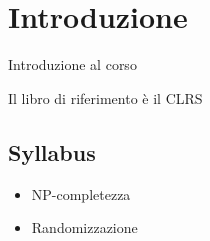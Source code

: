 
\section{Introduzione}

Introduzione al corso

Il libro di riferimento è il CLRS \cite{Cormen:2009:IAT:1614191}

\subsection{Syllabus}

\begin{itemize}
    \item NP-completezza
    \item Randomizzazione
\end{itemize}

\lipsum{}
